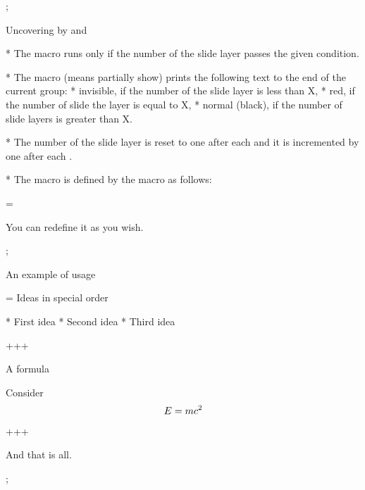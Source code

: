 \pg; %

\sec Uncovering by \code{\\use} and \code{\\pshow}

* The macro  runs \code{\\action} only if 
  the number of the slide layer passes the given condition.

* The macro  (means partially show) prints the following text to
  the end of the current group:
\begitems\parskip=0pt
* invisible, if the number of the slide layer is less than X,
* red, if the number of slide the layer is equal to X,
* normal (black), if the number of slide layers is greater than X. 
\enditems

* The number of the slide layer is reset to one after each \code{\\pg;} 
  and it is incremented by one after each \code{\\pg+}.

* The \code{\\pshow} macro is defined by the \code{\\use} macro as follows:

\pg=\begtt
\def\pshow#1{\use{=#1}\Red \use{<#1}\White \ignorespaces}
\endtt

You can redefine it as you wish.

\edef\restore{\leftskip=\the\leftskip \relax}

\pg; %

\sec An example of \code{\\pshow} usage

\pg=\typosize[13/15]\begtt
\secc Ideas in special order

* {\pshow1 First idea}
* {\pshow3 Second idea}
* {\pshow2 Third idea}

\pg+\pg+\pg+

\secc A formula

Consider
$$ 
  E = {\pshow5 m}{\pshow6 c^2}
$$

\pg+\pg+\pg+

And that is all.

\pg;
\endtt

\vskip-12cm \null 

\leftskip=10cm 
\def\s{\hskip10cm}

